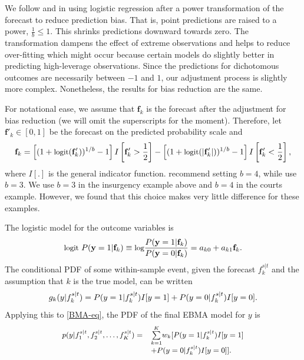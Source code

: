 \documentclass[12pt,fullpage,endnotes]{article}
\begin{document}
We follow \citet{Sloughter:2007} and \citet{Hamill:2004} in using
logistic regression after a power transformation of the forecast to
reduce prediction bias.  That is, point predictions are raised
to a power, $\frac{1}{b} \le 1$.  This shrinks predictions downward
towards zero.  The transformation dampens the effect of extreme
observations and helps to reduce over-fitting which might occur
because certain models do slightly better in predicting high-leverage
observations.  Since the predictions for dichotomous outcomes are
necessarily between $-1$ and $1$, our adjustment process is slightly
more complex.  Nonetheless, the results for bias reduction are the same.

For notational ease, we assume that $\mathbf{f}_k$ is the forecast
after the adjustment for bias reduction (we will omit the superscripts
for the moment).  Therefore, let $\mathbf{f}'_k \in [0,1]$ be the
forecast on the predicted probability scale and
\begin{equation}
\small
\mathbf{f}_k =  \left[(1+\mbox{logit}(\mathbf{f}'_k))^{1/b} - 1\right]I\left[\mathbf{f}'_k>\frac{1}{2}\right]  - \left[(1+\mbox{logit}(|\mathbf{f}'_k|))^{1/b} -  1\right]I\left[\mathbf{f}'_k<\frac{1}{2}\right],
 \end{equation}
 \noindent where $I[.]$ is the general indicator function.
 \citet{Hamill:2004} recommend setting $b=4$, while
 \citet{Sloughter:2007} use $b=3$.  We use $b=3$ in the insurgency
 example above and $b=4$ in the courts example.  However, we found
 that this choice makes very little difference for these examples.

The logistic model for the outcome variables is %
\begin{equation} \small
\label{one}
\mbox{logit } P(\mathbf{y}=1|\mathbf{f}_k) \equiv \mbox{log}\frac{P(\mathbf{y}=1|\mathbf{f}_k)}{P(\mathbf{y}=0|\mathbf{f}_k)} = a_{k0}+a_{k1}\mathbf{f}_k .
\end{equation}
\noindent The conditional PDF of some within-sample event, given the
forecast $f_{k}^{s|t}$ and the assumption that $k$ is the true model, can
be written
\begin{equation} 
\label{component-eq}
\small
g_k(y|f_{k}^{s|t}) = P(y=1|f_{k}^{s|t})I[y=1]  + P(y=0|f_{k}^{s|t})I[y=0].
\end{equation}
Applying this to \eqref{BMA-eq}, the PDF of the final EBMA model for
$y$ is
\begin{equation}
\label{pdf}
\small
\begin{array}{rl}
p(y|f_{1}^{s|t}, f_{2}^{s|t}, \ldots, f_{K}^{s|t}) = &
\overset{K}{\underset{k=1}{\sum}} w_k [
P(y=1|f_{k}^{s|t})I[y=1] \\
& + P(y=0|f_{k}^{s|t})I[y=0] ].\end{array}
\end{equation}
\end{document}
